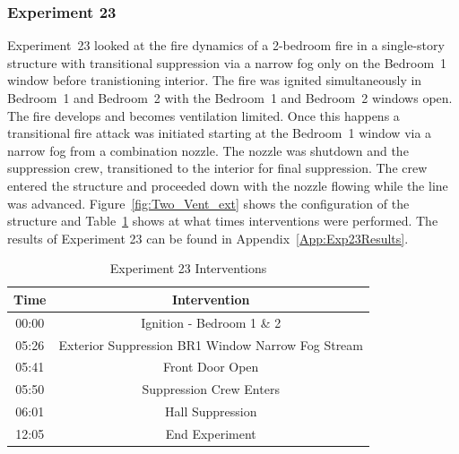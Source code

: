 \documentclass[12pt,oneside]{book}
\begin{document}
\clearpage

\subsubsection{Experiment 23}
Experiment~23 looked at the fire dynamics of a 2-bedroom fire in a single-story structure with transitional suppression via a narrow fog only on the Bedroom~1 window before tranistioning interior. The fire was ignited simultaneously in Bedroom~1 and Bedroom~2 with the Bedroom~1 and Bedroom~2 windows open. The fire develops and becomes ventilation limited. Once this happens a transitional fire attack was initiated starting at the Bedroom~1 window via a narrow fog from a combination nozzle. The nozzle was shutdown and the suppression crew, transitioned to the interior for final suppression. The crew entered the structure and proceeded down with the nozzle flowing while the line was advanced. Figure~\ref{fig:Two_Vent_ext} shows the configuration of the structure and Table~\ref{Table:Exp23Interventions} shows at what times interventions were performed. The results of Experiment 23 can be found in Appendix~\ref{App:Exp23Results}. 


\begin{table}[H]
	\centering
	\caption{Experiment 23 Interventions}
	\begin{tabular}{|c|c|} 
		\hline
		Time & Intervention \\ \hline \hline
		00:00 & Ignition - Bedroom 1 \& 2 \\ \hline
		05:26 & Exterior Suppression BR1 Window Narrow Fog Stream \\ \hline
		05:41 & Front Door Open \\ \hline
		05:50 & Suppression Crew Enters\\ \hline
		06:01 & Hall Suppression \\ \hline 
		12:05 & End Experiment\\ \hline
	\end{tabular}
	\label{Table:Exp23Interventions}
\end{table}

\clearpage
\end{document}
